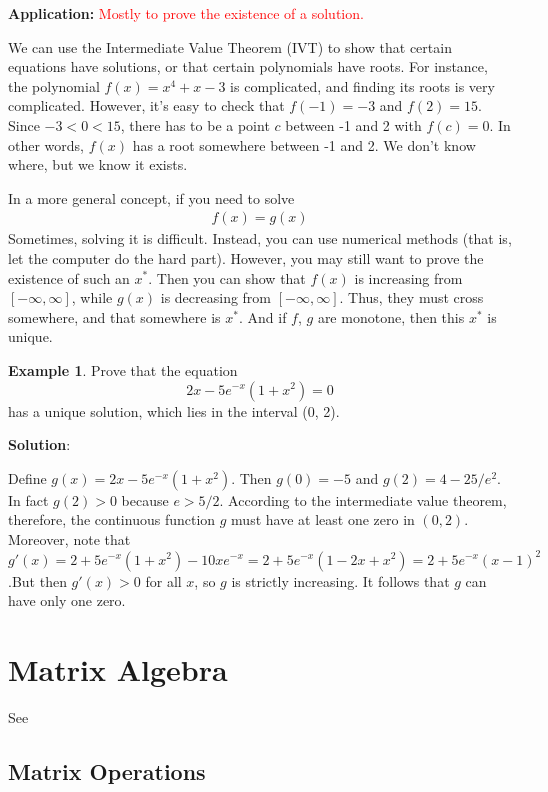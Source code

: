 \documentclass[11pt,a4paper]{book}
\newcommand{\red}[1]{\textcolor{red}{#1}}
\theoremstyle{definition}\newtheorem{definition}{Definition}
\theoremstyle{definition}\newtheorem{fact}{Fact}
\theoremstyle{definition}\newtheorem{remark}{Remark}
\theoremstyle{definition}\newtheorem{ex}{Ex.}
\theoremstyle{definition}\newtheorem{project}{Project}
\theoremstyle{definition}\newtheorem{problem}{Problem}
\theoremstyle{definition}\newtheorem{example}{Example}
\numberwithin{theorem}{section}
\numberwithin{corollary}{chapter}
\numberwithin{assumption}{chapter}
\numberwithin{definition}{chapter}
\numberwithin{prop}{chapter}
\numberwithin{notation}{chapter}
\numberwithin{problem}{chapter}
\numberwithin{example}{chapter}
\numberwithin{fact}{chapter}
\numberwithin{ex}{chapter}
\begin{document}
\begin{appendices}
	\textbf{Application:} \red{Mostly to prove the existence of a solution.}
	
	We can use the Intermediate Value Theorem (IVT) to show that certain equations have solutions, or that certain polynomials have roots. For instance, the polynomial \( f(x) = x^4 + x - 3 \) is complicated, and finding its roots is very complicated. However, it's easy to check that \( f(-1) = -3 \) and \( f(2) = 15 \). Since \( -3 < 0 < 15 \), there has to be a point \( c \) between -1 and 2 with \( f(c) = 0 \). In other words, \( f(x) \) has a root somewhere between -1 and 2. We don't know where, but we know it exists.
	
	In a more general concept, if you need to solve
	\begin{align*}
		f(x) = g(x)
	\end{align*}
	Sometimes, solving it is difficult. Instead, you can use numerical methods (that is, let the computer do the hard part). However, you may still want to prove the existence of such an $x^*$. Then you can show that $f(x)$ is increasing from $[-\infty,\infty]$, while $g(x)$ is decreasing from $[-\infty,\infty]$. Thus, they must cross somewhere, and that somewhere is $x^*$. And if $f$, $g$ are monotone, then this $x^*$ is unique.
	
	\begin{example}
		Prove that the equation
		$$2x - 5e^{-x}(1+x^2)=0$$
		has a unique solution, which lies in the interval (0, 2).
		
		\textbf{Solution}:
		
		Define $g(x) = 2x - 5e^{-x}(1 + x^2)$. Then $g(0) = -5$ and $g(2) = 4 - 25/e^2$. In fact $g(2) > 0$ because $e > 5/2$. According to the intermediate value theorem, therefore, the continuous function $g$ must have at least one zero in $(0, 2)$. Moreover, note that $g'(x) = 2 + 5e^{-x}(1+x^2)-10xe^{-x} =2+5e^{-x}(1-2x+x^2)=2+5e^{-x}(x-1)^2$.But then $g'(x)>0$ for all $x$, so $g$ is strictly increasing. It follows that $g$ can have only one zero.
	\end{example}
	
	\section{Matrix Algebra}
	See \citet[Ch. 9]{springcamp}
	\subsection*{Matrix Operations}
	

\end{appendices}
\end{document}
